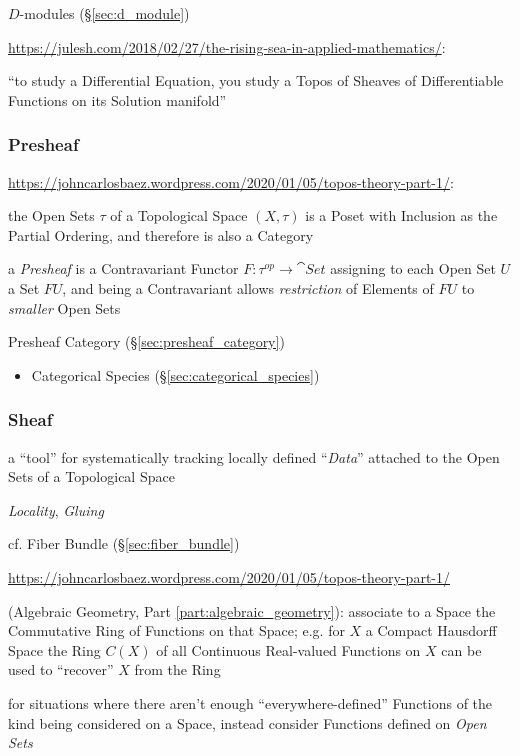 \fist $D$-modules (\S\ref{sec:d_module})

\url{https://julesh.com/2018/02/27/the-rising-sea-in-applied-mathematics/}:

``to study a Differential Equation, you study a Topos of Sheaves of
Differentiable Functions on its Solution manifold''



\subsubsection{Presheaf}\label{sec:presheaf}

\url{https://johncarlosbaez.wordpress.com/2020/01/05/topos-theory-part-1/}:

the Open Sets $\tau$ of a Topological Space $(X, \tau)$ is a Poset with
Inclusion as the Partial Ordering, and therefore is also a Category

a \emph{Presheaf} is a Contravariant Functor $F : \tau^{op} \rightarrow
\cat{Set}$ assigning to each Open Set $U$ a Set $F U$, and being a Contravariant
allows \emph{restriction} of Elements of $F U$ to \emph{smaller} Open Sets

Presheaf Category (\S\ref{sec:presheaf_category})

\begin{itemize}
  \item Categorical Species (\S\ref{sec:categorical_species})
\end{itemize}



\subsubsection{Sheaf}\label{sec:sheaf}

a ``tool'' for systematically tracking locally defined ``\emph{Data}'' attached
to the Open Sets of a Topological Space

\emph{Locality}, \emph{Gluing}

cf. Fiber Bundle (\S\ref{sec:fiber_bundle})

\url{https://johncarlosbaez.wordpress.com/2020/01/05/topos-theory-part-1/}

(Algebraic Geometry, Part \ref{part:algebraic_geometry}): associate to a Space
the Commutative Ring of Functions on that Space; e.g. for $X$ a Compact
Hausdorff Space the Ring $C(X)$ of all Continuous Real-valued Functions on $X$
can be used to ``recover'' $X$ from the Ring

for situations where there aren't enough ``everywhere-defined'' Functions of the
kind being considered on a Space, instead consider Functions defined on
\emph{Open Sets}

